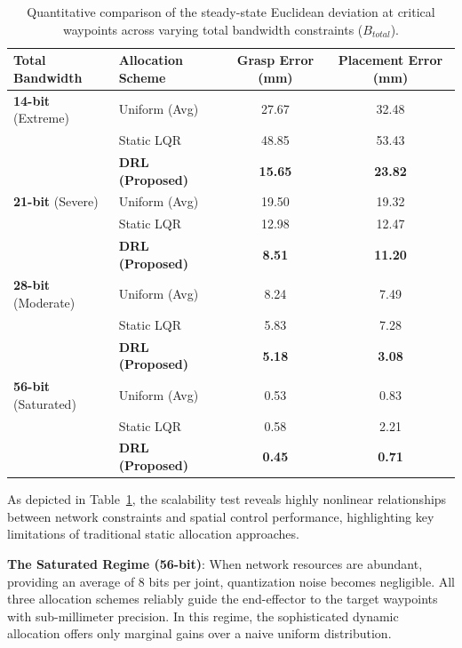 \begin{table}[H]
  \centering
  \renewcommand{\arraystretch}{1.8} %
  \caption{Quantitative comparison of the steady-state Euclidean deviation at critical waypoints across varying total bandwidth constraints ($B_{total}$).}
  \begin{tabular}{llcc}
    \toprule
    \textbf{Total Bandwidth} & \textbf{Allocation Scheme} & \textbf{Grasp Error (mm)} & \textbf{Placement Error (mm)} \\
    \midrule
    \textbf{14-bit} (Extreme) & Uniform (Avg) & 27.67 & 32.48 \\
                              & Static LQR    & 48.85 & 53.43 \\
                              & \textbf{DRL (Proposed)} & \textbf{15.65} & \textbf{23.82} \\
    \addlinespace
    \textbf{21-bit} (Severe)  & Uniform (Avg) & 19.50 & 19.32 \\
                              & Static LQR    & 12.98 & 12.47 \\
                              & \textbf{DRL (Proposed)} & \textbf{8.51}  & \textbf{11.20} \\
    \addlinespace
    \textbf{28-bit} (Moderate)& Uniform (Avg) & 8.24  & 7.49  \\
                              & Static LQR    & 5.83  & 7.28  \\
                              & \textbf{DRL (Proposed)} & \textbf{5.18}  & \textbf{3.08}  \\
    \addlinespace
    \textbf{56-bit} (Saturated)& Uniform (Avg) & 0.53  & 0.83  \\
                              & Static LQR    & 0.58  & 2.21  \\
                              & \textbf{DRL (Proposed)} & \textbf{0.45}  & \textbf{0.71}  \\
    \bottomrule
  \end{tabular}
  
  \label{tab:qc}
\end{table}
As depicted in Table~\ref{tab:qc}, the scalability test reveals highly nonlinear relationships between network constraints and spatial control performance, highlighting key limitations of traditional static allocation approaches.

\noindent\textbf{The Saturated Regime (56-bit)}: When network resources are abundant, providing an average of 8 bits per joint, quantization noise becomes 
negligible. All three allocation schemes reliably guide the end-effector to the target waypoints with sub-millimeter precision. In this regime, 
the sophisticated dynamic allocation offers only marginal gains over a naive uniform distribution.

